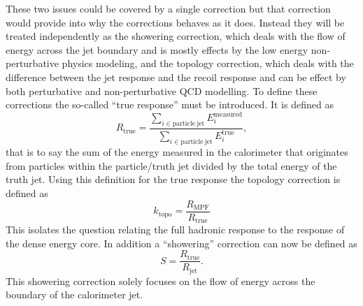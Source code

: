 These two issues could be covered by a single correction but that correction would provide into why the corrections behaves as it does.  
Instead they will be treated independently as the showering correction, which deals with the flow of energy across the jet boundary and is mostly effects by the low energy non-perturbative physics modeling, and the topology correction, which deals with the difference between the jet response and the recoil response and can be effect by both perturbative and non-perturbative QCD modelling.  
To define these corrections the so-called ``true response'' must be introduced.  
It is defined as 
\begin{equation}
  R_{\mathrm{true}} = \frac{\sum_{i\in{\mathrm{particle~jet}}} E_i^{\mathrm{measured}}}{\sum_{i\in{\mathrm{particle~jet}}}E_i^{\mathrm{true}}}, 
\end{equation}
\noindent
that is to say the sum of the energy measured in the calorimeter that originates from particles within the particle/truth jet divided by the total energy of the truth jet.  
Using this definition for the true response the topology correction is defined as
\begin{equation}
  k_{\mathrm{topo}} = \frac{R_{\mathrm{MPF}}}{R_{\mathrm{true}}}
\end{equation}
\noindent
This isolates the question relating the full hadronic response to the response of the dense energy core.
In addition a ``showering'' correction can now be defined as 
\begin{equation}
  S = \frac{R_{\mathrm{true}}}{R_{\mathrm{jet}}}.  
\end{equation}
\noindent
This showering correction solely focuses on the flow of energy across the boundary of the calorimeter jet.


